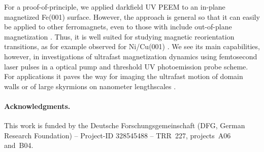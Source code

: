 \documentclass[prl,twocolumn,floatfix]{revtex4-2}
\begin{document}
For a proof-of-principle, we applied darkfield UV PEEM to an in-plane magnetized Fe(001) surface. However, the approach is general so that it can easily be applied to other ferromagnets, even to those with include out-of-plane magnetization \cite{kronseder2011}. Thus, it is well suited for studying magnetic reorientation transitions, as for example observed for Ni/Cu(001) \cite{fukumoto2002,sander2004,nakagawa2006,kronseder2011}. We see its main capabilities, however, in investigations of ultrafast magnetization dynamics using femtosecond laser pulses in a optical pump and threshold UV photoemission probe scheme. For applications it paves the way for imaging the ultrafast motion of domain walls \cite{parkin2008} or of large skyrmions on nanometer lengthscales \cite{goebel2019,jani2021,kern2022}.

\paragraph{Acknowledgments.} This work is funded by the Deutsche Forschungsgemeinschaft (DFG, German Research Foundation) -- Project-ID 328545488 -- TRR~227, projects~A06 and~B04.

% 


\listoftodos
\end{document}
